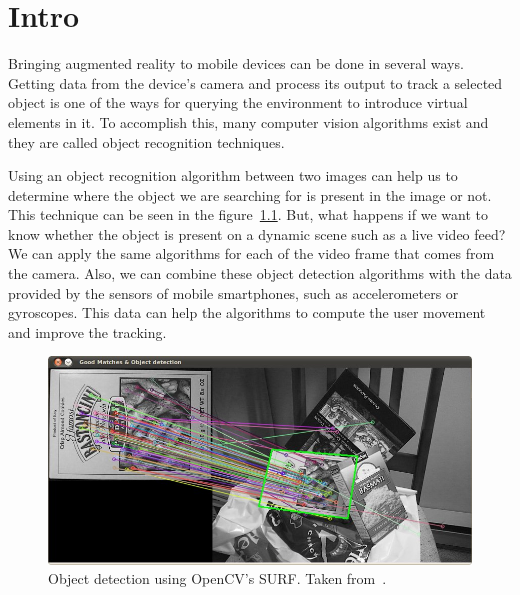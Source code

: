 \chapter{Intro}

Bringing augmented reality to mobile devices can be done in several ways. Getting
data from the device's camera and process its output to track a selected object is
one of the ways for querying the environment to introduce virtual elements in it. To
accomplish this, many computer vision algorithms exist and they are called object
recognition techniques.  

Using an object recognition algorithm between two images can help us to
determine where the object we are searching for is present in the image or
not. This technique can be seen in the figure~\ref{fig:introdetect}. But, what happens if
we want to know whether the object is present on a dynamic scene such as a
live video feed? We can apply the same algorithms for each of the video frame
that comes from the camera. 
Also, we can combine these object detection algorithms with the data provided
by the sensors of mobile smartphones, such as accelerometers or
gyroscopes. This data can help the algorithms to compute the user movement and
improve the tracking.

\begin{figure}
\centering
\includegraphics[scale=0.45]{img/intro-feature.jpg}
\caption{\label{fig:introdetect} Object detection using OpenCV's SURF. Taken
  from~\cite{opencvhomography}.} 
\end{figure} 

